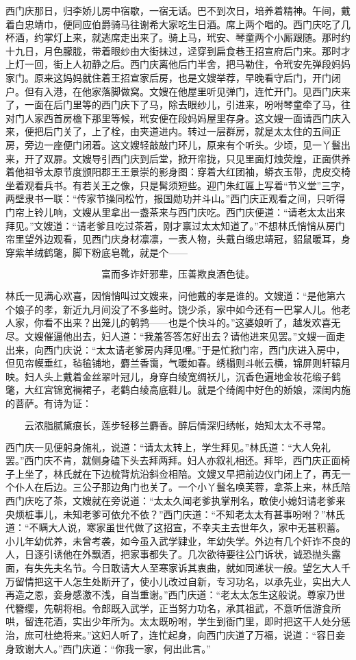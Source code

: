 西门庆那日，归李娇儿房中宿歇，一宿无话。巴不到次日，培养着精神。午间，戴着白忠靖巾，便同应伯爵骑马往谢希大家吃生日酒。席上两个唱的。西门庆吃了几杯酒，约掌灯上来，就逃席走出来了。骑上马，玳安、琴童两个小厮跟随。那时约十九日，月色朦胧，带着眼纱由大街抹过，迳穿到扁食巷王招宣府后门来。那时才上灯一回，街上人初静之后。西门庆离他后门半舍，把马勒住，令玳安先弹段妈妈家门。原来这妈妈就住着王招宣家后房，也是文嫂举荐，早晚看守后门，开门闭户。但有入港，在他家落脚做窝。文嫂在他屋里听见弹门，连忙开门。见西门庆来了，一面在后门里等的西门庆下了马，除去眼纱儿，引进来，吩咐琴童牵了马，往对门人家西首房檐下那里等候，玳安便在段妈妈屋里存身。这文嫂一面请西门庆入来，便把后门关了，上了栓，由夹道进内。转过一层群房，就是太太住的五间正房，旁边一座便门闭着。这文嫂轻敲敲门环儿，原来有个听头。少顷，见一丫鬟出来，开了双扉。文嫂导引西门庆到后堂，掀开帘拢，只见里面灯烛荧煌，正面供养着他祖爷太原节度颁阳郡王王景崇的影身图：穿着大红团袖，蟒衣玉带，虎皮交椅坐着观看兵书。有若关王之像，只是髯须短些。迎门朱红匾上写着“节义堂”三字，两壁隶书一联：“传家节操同松竹，报国勋功并斗山。”西门庆正观看之间，只听得门帘上铃儿响，文嫂从里拿出一盏茶来与西门庆吃。西门庆便道：“请老太太出来拜见。”文嫂道：“请老爹且吃过茶着，刚才禀过太太知道了。”不想林氏悄悄从房门帘里望外边观看，见西门庆身材凛凛，一表人物，头戴白缎忠靖冠，貂鼠暖耳，身穿紫羊绒鹤氅，脚下粉底皂靴，就是个——

\[
富而多诈奸邪辈，压善欺良酒色徒。
\]

林氏一见满心欢喜，因悄悄叫过文嫂来，问他戴的孝是谁的。文嫂道：“是他第六个娘子的孝，新近九月间没了不多些时。饶少杀，家中如今还有一巴掌人儿。他老人家，你看不出来？出笼儿的鹌鹑——也是个快斗的。”这婆娘听了，越发欢喜无尽。文嫂催逼他出去，妇人道：“我羞答答怎好出去？请他进来见罢。”文嫂一面走出来，向西门庆说：“太太请老爹房内拜见哩。”于是忙掀门帘，西门庆进入房中，但见帘幙垂红，毡毺铺地，麝兰香霭，气暖如春。绣榻则斗帐云横，锦屏则轩辕月映。妇人头上戴着金丝翠叶冠儿，身穿白绫宽绸袄儿，沉香色遍地金妆花缎子鹤氅，大红宫锦宽襕裙子，老鹳白绫高底鞋儿。就是个绮阁中好色的娇娘，深闺内施\textMaoBi 的菩萨。有诗为证：

\[
云浓脂腻黛痕长，莲步轻移兰麝香。
醉后情深归绣帐，始知太太不寻常。
\]

西门庆一见便躬身施礼，说道：“请太太转上，学生拜见。”林氏道：“大人免礼罢。”西门庆不肯，就侧身磕下头去拜两拜。妇人亦叙礼相还。拜毕，西门庆正面椅子上坐了，林氏就在下边梳背炕沿斜佥相陪。文嫂又早把前边仪门闭上了，再无一个仆人在后边。三公子那边角门也关了。一个小丫鬟名唤芙蓉，拿茶上来，林氏陪西门庆吃了茶，文嫂就在旁说道：“太太久闻老爹执掌刑名，敢使小媳妇请老爹来央烦桩事儿，未知老爹可依允不依？”西门庆道：“不知老太太有甚事吩咐？”林氏道：“不瞒大人说，寒家虽世代做了这招宣，不幸夫主去世年久，家中无甚积蓄。小儿年幼优养，未曾考袭，如今虽入武学肄业，年幼失学。外边有几个奸诈不良的人，日逐引诱他在外飘酒，把家事都失了。几次欲待要往公门诉状，诚恐抛头露面，有失先夫名节。今日敢请大人至寒家诉其衷曲，就如同递状一般。望乞大人千万留情把这干人怎生处断开了，使小儿改过自新，专习功名，以承先业，实出大人再造之恩，妾身感激不浅，自当重谢。”西门庆道：“老太太怎生这般说。尊家乃世代簪缨，先朝将相。令郎既入武学，正当努力功名，承其祖武，不意听信游食所哄，留连花酒，实出少年所为。太太既吩咐，学生到衙门里，即时把这干人处分惩治，庶可杜绝将来。”这妇人听了，连忙起身，向西门庆道了万福，说道：“容日妾身致谢大人。”西门庆道：“你我一家，何出此言。”

